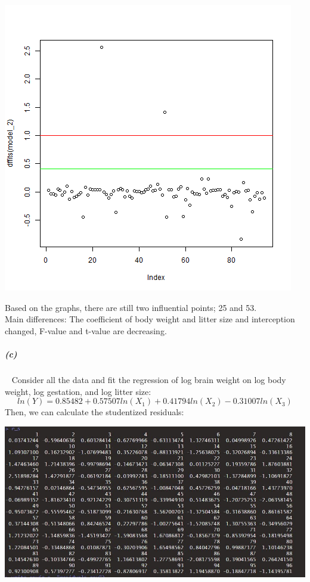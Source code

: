 \documentclass[12pt,a4paper]{article}
\begin{document}
\begin{center}
\includegraphics[scale=0.6]{3_b_3.png}
\end{center}
Based on the graphs, there are still  two influential points; 25 and 53.\\
\newline
Main differences: The coefficient of body weight and litter size and interception changed, F-value and t-value are decreasing.
\subparagraph{(c)}~{}
 Consider all the data and ﬁt the regression of log brain weight on log body weight, log gestation, and log litter size:
\[ln(Y) = 0.85482 + 0.57507ln(X_1) + 0.41794ln(X_2) - 0.31007ln(X_3)\]
Then, we can calculate the studentized residuals:\\
\begin{center}
\includegraphics[scale = 0.6]{3_c.jpeg}
\end{center}
\end{document}
